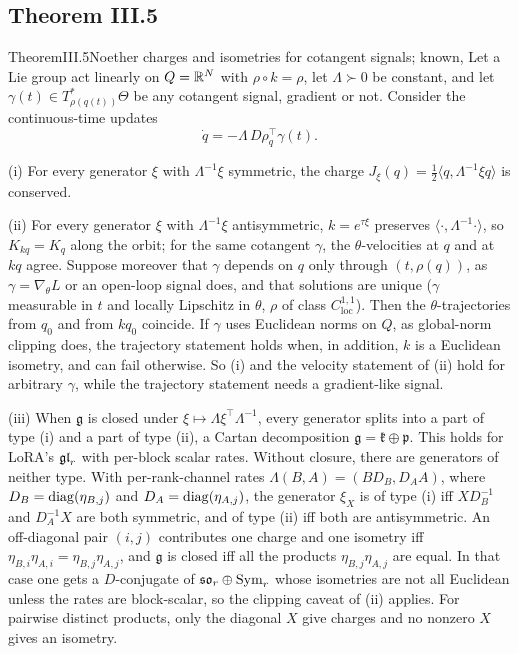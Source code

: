 \subsection{Theorem III.5}\label{proof:III.5}

\begin{restate}{Theorem}{III.5}{Noether charges and isometries for cotangent signals; known, \citet{zhao2022symmetries}}
Let a Lie group act linearly on $Q=\mathbb{R}^N$ with $\rho\circ k=\rho$, let $\Lambda\succ0$ be constant, and let
$\gamma(t)\in T^*_{\rho(q(t))}\Theta$ be any cotangent signal, gradient or not. Consider the continuous-time updates
\[\dot q=-\Lambda\,D\rho_q^\top\gamma(t).\]

(i) For every generator $\xi$ with $\Lambda^{-1}\xi$ symmetric, the charge $J_\xi(q)=\tfrac12\langle q,\Lambda^{-1}\xi q\rangle$
is conserved.

(ii) For every generator $\xi$ with $\Lambda^{-1}\xi$ antisymmetric, $k=e^{\tau\xi}$ preserves
$\langle\cdot,\Lambda^{-1}\cdot\rangle$, so $K_{kq}=K_q$ along the orbit; for the same cotangent $\gamma$, the
$\theta$-velocities at $q$ and at $kq$ agree. Suppose moreover that $\gamma$ depends on $q$ only through $(t,\rho(q))$, as
$\gamma=\nabla_\theta L$ or an open-loop signal does, and that solutions are unique ($\gamma$ measurable in $t$ and
locally Lipschitz in $\theta$, $\rho$ of class $C^{1,1}_{\mathrm{loc}}$). Then the $\theta$-trajectories from $q_0$ and
from $kq_0$ coincide. If $\gamma$ uses Euclidean norms on $Q$, as global-norm clipping does, the trajectory statement
holds when, in addition, $k$ is a Euclidean isometry, and can fail otherwise. So (i) and the velocity statement of (ii)
hold for arbitrary $\gamma$, while the trajectory statement needs a gradient-like signal.

(iii) When $\mathfrak g$ is closed under $\xi\mapsto\Lambda\xi^\top\Lambda^{-1}$, every generator splits into a part of
type (i) and a part of type (ii), a Cartan decomposition $\mathfrak g=\mathfrak k\oplus\mathfrak p$. This holds for
LoRA's $\mathfrak{gl}_r$ with per-block scalar rates. Without closure, there are generators of neither type. With per-rank-channel
rates $\Lambda(B,A)=(BD_B,D_AA)$, where $D_B=\operatorname{diag}(\eta_{B,j})$ and $D_A=\operatorname{diag}(\eta_{A,j})$, the generator $\xi_X$ is of
type (i) iff $XD_B^{-1}$ and $D_A^{-1}X$ are both symmetric, and of type (ii) iff both are antisymmetric. An off-diagonal
pair $(i,j)$ contributes one charge and one isometry iff $\eta_{B,i}\eta_{A,i}=\eta_{B,j}\eta_{A,j}$, and $\mathfrak g$
is closed iff all the products $\eta_{B,j}\eta_{A,j}$ are equal. In that case one gets a $D$-conjugate of
$\mathfrak{so}_r\oplus\mathrm{Sym}_r$ whose isometries are not all Euclidean unless the rates are
block-scalar, so the clipping caveat of (ii) applies. For pairwise distinct
products, only the diagonal $X$ give charges and no nonzero $X$ gives an isometry.
\end{restate}


